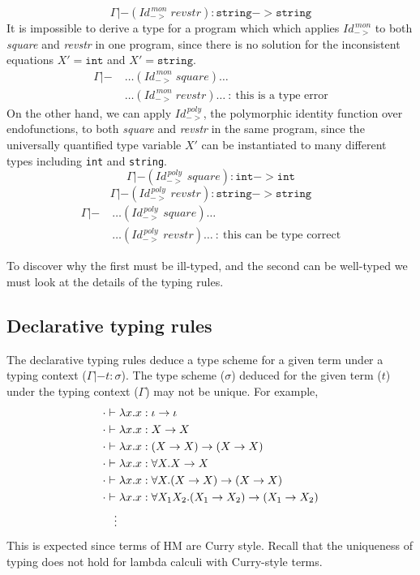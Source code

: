 \[ \Gamma |-
	(\textit{Id}_{->}^{\,\textit{mon}}\;\textit{revstr}) :
	\texttt{string} -> \texttt{string}
\]
It is impossible to derive a type for a program which which applies
$\textit{Id}_{->}^{\,\textit{mon}}$ to both \textit{square} and \textit{revstr} 
in one program, since there is no solution for the inconsistent equations
$X'=\mathtt{int}$ and $X'=\mathtt{string}$.
\begin{align*}
\Gamma |- \;
& \dots (\textit{Id}_{->}^{\,\textit{mon}}\;\textit{square}) \dots \\
& \dots (\textit{Id}_{->}^{\,\textit{mon}}\;\textit{revstr}) \dots
~:~ \text{this is a type error}
\end{align*}
On the other hand, we can apply $\textit{Id}_{->}^{\,\textit{poly}}$,
the polymorphic identity function over endofunctions, to both
\textit{square} and \textit{revstr} in the same program, since
the universally quantified type variable $X'$ can be instantiated
to many different types including \texttt{int} and \texttt{string}.
\[ \Gamma |-
	(\textit{Id}_{->}^{\,\textit{poly}}\;\textit{square}) :
	\texttt{int} -> \texttt{int}
\]
\[ \Gamma |-
	(\textit{Id}_{->}^{\,\textit{poly}}\;\textit{revstr}) :
	\texttt{string} -> \texttt{string}
\]
\begin{align*}
\Gamma |-\;
& \dots (\textit{Id}_{->}^{\,\textit{poly}}\;\textit{square}) \dots \\
& \dots (\textit{Id}_{->}^{\,\textit{poly}}\;\textit{revstr}) \dots
~:~ \text{this can be type correct}
\end{align*}

To discover why the first must be ill-typed, and the second can be well-typed
we must look at the details of the typing rules.

\subsection{Declarative typing rules}\label{sec:hm:dectyrule}
The declarative typing rules deduce a type scheme for a given term under
a typing context ($\Gamma |- t : \sigma$). The type scheme ($\sigma$)
deduced for the given term ($t$) under the typing context ($\Gamma$) may not
be unique. For example,
\begin{align*}
	&\cdot |- \lambda x.x: \iota -> \iota \\
	&\cdot |- \lambda x.x: X -> X \\
	&\cdot |- \lambda x.x: (X -> X) -> (X -> X) \\
	&\cdot |- \lambda x.x: \forall X.X -> X \\
	&\cdot |- \lambda x.x: \forall X.(X -> X) -> (X -> X) \\
	&\cdot |- \lambda x.x: \forall X_1 X_2.(X_1 -> X_2) -> (X_1 -> X_2) \\
	&\quad \vdots
\end{align*}
This is expected since terms of HM are Curry style. Recall that
the uniqueness of typing does not hold for lambda calculi with
Curry-style terms.

